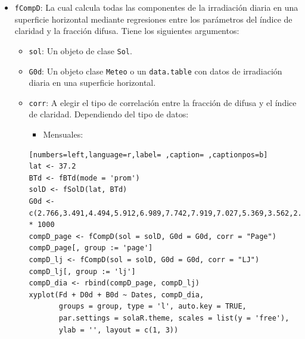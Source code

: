 \begin{itemize}
\item \texttt{fCompD}: La cual calcula todas las componentes de la irradiación diaria en una superficie horizontal mediante regresiones entre los parámetros del índice de claridad y la fracción difusa.
Tiene los siguientes argumentos:
\begin{itemize}
\item \texttt{sol}: Un objeto de clase \texttt{Sol}.
\item \texttt{G0d}: Un objeto clase \texttt{Meteo} o un \texttt{data.table} con datos de irradiación diaria en una superficie horizontal.
\item \texttt{corr}: A elegir el tipo de correlación entre la fracción de difusa y el índice de claridad.
Dependiendo del tipo de datos:
\begin{itemize}
\item Mensuales:
\end{itemize}
\begin{lstlisting}[numbers=left,language=r,label= ,caption= ,captionpos=b]
lat <- 37.2
BTd <- fBTd(mode = 'prom')
solD <- fSolD(lat, BTd)
G0d <- c(2.766,3.491,4.494,5.912,6.989,7.742,7.919,7.027,5.369,3.562,2.814,2.179) * 1000
compD_page <- fCompD(sol = solD, G0d = G0d, corr = "Page")
compD_page[, group := 'page']
compD_lj <- fCompD(sol = solD, G0d = G0d, corr = "LJ")
compD_lj[, group := 'lj']
compD_dia <- rbind(compD_page, compD_lj)
xyplot(Fd + D0d + B0d ~ Dates, compD_dia,
       groups = group, type = 'l', auto.key = TRUE,
       par.settings = solaR.theme, scales = list(y = 'free'),
       ylab = '', layout = c(1, 3))

\end{lstlisting}


\end{itemize}
\end{itemize}

